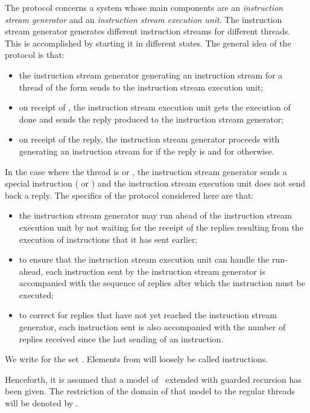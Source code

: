 \documentclass[fleqn]{llncs}
\begin{document}
The protocol concerns a system whose main components are an
\emph{instruction stream generator} and an \emph{instruction stream
execution unit}.
The instruction stream generator generates different instruction
streams for different threads.
This is accomplished by starting it in different states.
The general idea of the protocol is that:
\begin{itemize}
\item
the instruction stream generator generating an instruction stream for a
thread of the form  sends  to the instruction stream
execution unit;
\item
on receipt of , the instruction stream execution unit gets the
execution of  done and sends the reply produced to the instruction
stream generator;
\item
on receipt of the reply, the instruction stream generator proceeds with
generating an instruction stream for  if the reply is  and for
 otherwise.
\end{itemize}
In the case where the thread is  or , the instruction
stream generator sends a special instruction ( or ) and
the instruction stream execution unit does not send back a reply.
The specifics of the protocol considered here are that:
\begin{itemize}
\item
the instruction stream generator may run ahead of the instruction stream
execution unit by not waiting for the receipt of the replies resulting
from the execution of instructions that it has sent earlier;
\item
to ensure that the instruction stream execution unit can handle the
run-ahead, each instruction sent by the instruction stream generator is
accompanied with the sequence of replies after which the instruction
must be executed;
\item
to correct for replies that have not yet reached the instruction stream
generator, each instruction sent is also accompanied with the number of
replies received since the last sending of an instruction.
\end{itemize}

We write  for the set .
Elements from  will loosely be called instructions.

Henceforth, it is assumed that a model of \BTA\ extended with guarded
recursion has been given.
The restriction of the domain of that model to the regular threads will
be denoted by .
\end{document}
